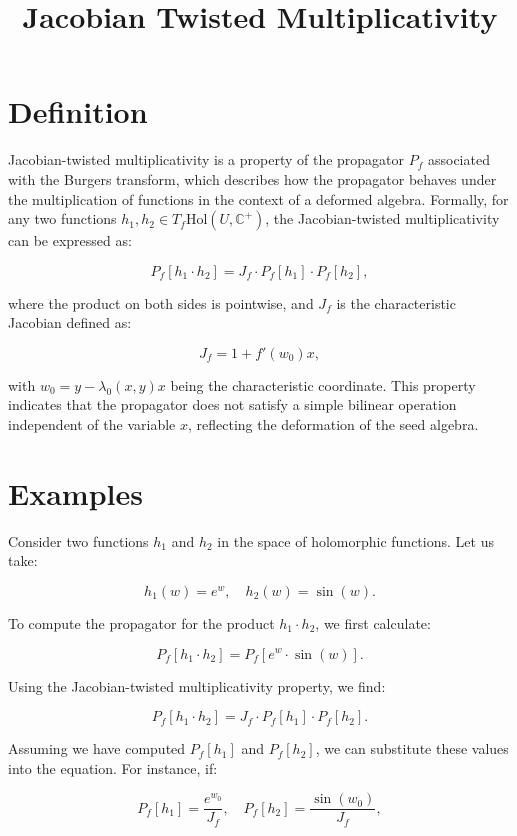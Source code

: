 \documentclass[11pt,a4paper]{article}
\title{Jacobian Twisted Multiplicativity}
\date{}
\begin{document}
\maketitle
\section{Definition}
Jacobian-twisted multiplicativity is a property of the propagator $P_f$ associated with the Burgers transform, which describes how the propagator behaves under the multiplication of functions in the context of a deformed algebra. Formally, for any two functions $h_1, h_2 \in T_f \text{Hol}(U, \mathbb{C}^+)$, the Jacobian-twisted multiplicativity can be expressed as:

\begin{equation}
P_f[h_1 \cdot h_2] = J_f \cdot P_f[h_1] \cdot P_f[h_2],
\end{equation}

where the product on both sides is pointwise, and $J_f$ is the characteristic Jacobian defined as:

\begin{equation}
J_f = 1 + f'(w_0) x,
\end{equation}

with $w_0 = y - \lambda_0(x, y) x$ being the characteristic coordinate. This property indicates that the propagator does not satisfy a simple bilinear operation independent of the variable $x$, reflecting the deformation of the seed algebra.

\section{Examples}
Consider two functions $h_1$ and $h_2$ in the space of holomorphic functions. Let us take:

\[
h_1(w) = e^{w}, \quad h_2(w) = \sin(w).
\]

To compute the propagator for the product $h_1 \cdot h_2$, we first calculate:

\[
P_f[h_1 \cdot h_2] = P_f[e^{w} \cdot \sin(w)].
\]

Using the Jacobian-twisted multiplicativity property, we find:

\[
P_f[h_1 \cdot h_2] = J_f \cdot P_f[h_1] \cdot P_f[h_2].
\]

Assuming we have computed $P_f[h_1]$ and $P_f[h_2]$, we can substitute these values into the equation. For instance, if:

\[
P_f[h_1] = \frac{e^{w_0}}{J_f}, \quad P_f[h_2] = \frac{\sin(w_0)}{J_f},
\]
\end{document}
